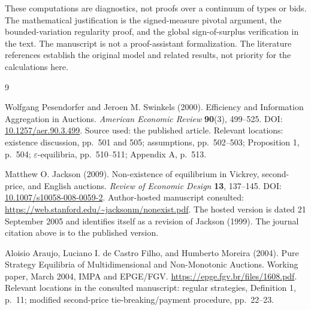 \documentclass[11pt,a4paper]{article}
\numberwithin{equation}{section}
\theoremstyle{definition}
\theoremstyle{remark}
\begin{document}
These computations are diagnostics, not proofs over a continuum of types or bids. The mathematical justification is the signed-measure pivotal argument, the bounded-variation regularity proof, and the global sign-of-surplus verification in the text. The manuscript is not a proof-assistant formalization. The literature references establish the original model and related results, not priority for the calculations here.

\clearpage
\begin{thebibliography}{9}

Wolfgang Pesendorfer and Jeroen M. Swinkels (2000).
\newblock Efficiency and Information Aggregation in Auctions.
\newblock \emph{American Economic Review} \textbf{90}(3), 499--525.
\newblock DOI: \href{https://doi.org/10.1257/aer.90.3.499}{10.1257/aer.90.3.499}.
\newblock Source used: the published article. Relevant locations: existence discussion, pp.~501 and 505; assumptions, pp.~502--503; Proposition 1, p.~504; $\varepsilon$-equilibria, pp.~510--511; Appendix A, p.~513.

Matthew O. Jackson (2009).
\newblock Non-existence of equilibrium in Vickrey, second-price, and English auctions.
\newblock \emph{Review of Economic Design} \textbf{13}, 137--145.
\newblock DOI: \href{https://doi.org/10.1007/s10058-008-0059-2}{10.1007/s10058-008-0059-2}.
\newblock Author-hosted manuscript consulted:
\url{https://web.stanford.edu/~jacksonm/nonexist.pdf}.
\newblock The hosted version is dated 21 September 2005 and identifies itself as a revision of Jackson (1999). The journal citation above is to the published version.

Aloisio Araujo, Luciano I. de Castro Filho, and Humberto Moreira (2004).
\newblock Pure Strategy Equilibria of Multidimensional and Non-Monotonic Auctions.
\newblock Working paper, March 2004, IMPA and EPGE/FGV.
\newblock \url{https://epge.fgv.br/files/1608.pdf}.
\newblock Relevant locations in the consulted manuscript: regular strategies, Definition 1, p.~11; modified second-price tie-breaking/payment procedure, pp.~22--23.

\end{thebibliography}
\end{document}
